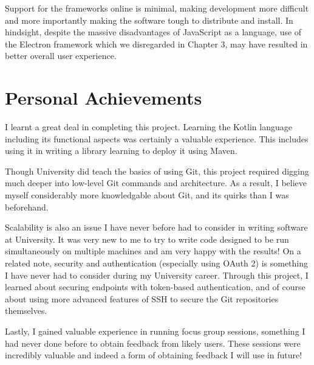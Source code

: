 Support for the frameworks online is minimal, making development more difficult and more importantly making the software tough to distribute and install. In hindsight, despite the massive disadvantages of JavaScript as a language, use of the Electron framework which we disregarded in Chapter 3, may have resulted in better overall user experience.


\section{Personal Achievements}

I learnt a great deal in completing this project. Learning the Kotlin language including its functional aspects was certainly a valuable experience. This includes using it in writing a library learning to deploy it using Maven.

Though University did teach the basics of using Git, this project required digging much deeper into low-level Git commands and architecture. As a result, I believe myself considerably more knowledgable about Git, and its quirks than I was beforehand. 

Scalability is also an issue I have never before had to consider in writing software at University. It was very new to me to try to write code designed to be run simultaneously on multiple machines and am very happy with the results! On a related note, security and authentication (especially using OAuth 2) is something I have never had to consider during my University career. Through this project, I learned about securing endpoints with token-based authentication, and of course about using more advanced features of SSH to secure the Git repositories themselves.

Lastly, I gained valuable experience in running focus group sessions, something I had never done before to obtain feedback from likely users. These sessions were incredibly valuable and indeed a form of obtaining feedback I will use in future!